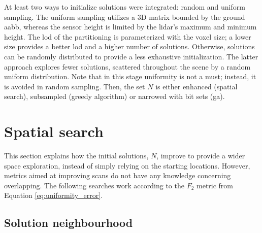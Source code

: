 At least two ways to initialize solutions were integrated: random and uniform sampling. The uniform sampling utilizes a 3D matrix bounded by the ground \acrshort{aabb}, whereas the sensor height is limited by the \acrshort{lidar}'s maximum and minimum height. The \acrshort{lod} of the partitioning is parameterized with the voxel size; a lower size provides a better \acrshort{lod} and a higher number of solutions. Otherwise, solutions can be randomly distributed to provide a less exhaustive initialization. The latter approach explores fewer solutions, scattered throughout the scene by a random uniform distribution. Note that in this stage uniformity is not a must; instead, it is avoided in random sampling. Then, the set $N$ is either enhanced (spatial search), subsampled (greedy algorithm) or narrowed with bit sets (\acrshort{ga}). 

\section{Spatial search}

This section explains how the initial solutions, $N$, improve to provide a wider space exploration, instead of simply relying on the starting locations. However, metrics aimed at improving scans do not have any knowledge concerning overlapping. The following searches work according to the $F_2$ metric from Equation \ref{eq:uniformity_error}.

\subsection{Solution neighbourhood}

